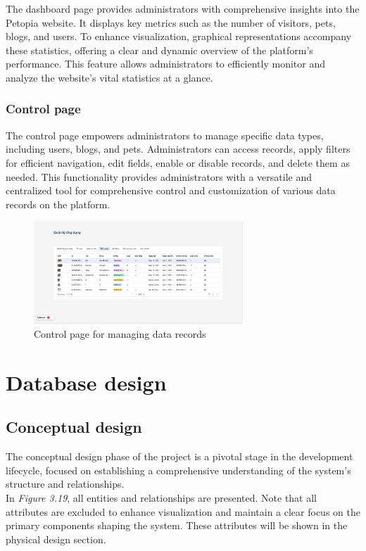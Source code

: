 The dashboard page provides administrators with comprehensive insights into the Petopia website. It displays key metrics such as the number of visitors, pets, blogs, and users. To enhance visualization, graphical representations accompany these statistics, offering a clear and dynamic overview of the platform's performance. This feature allows administrators to efficiently monitor and analyze the website's vital statistics at a glance.

\subsubsection{Control page}

The control page empowers administrators to manage specific data types, including users, blogs, and pets. Administrators can access records, apply filters for efficient navigation, edit fields, enable or disable records, and delete them as needed. This functionality provides administrators with a versatile and centralized tool for comprehensive control and customization of various data records on the platform.

\begin {figure}[H]
\centering
\includegraphics[width=0.7\textwidth]{Figures/UI/control_bo_ui.png}
\caption{Control page for managing data records}
\end{figure}

\newpage
\section{Database design}

\subsection{Conceptual design}

The conceptual design phase of the project is a pivotal stage in the development lifecycle, focused on establishing a comprehensive understanding of the system's structure and relationships.
\\
In \textit{Figure 3.19}, all entities and relationships are presented. Note that all attributes are excluded to enhance visualization and maintain a clear focus on the primary components shaping the system. These attributes will be shown in the physical design section.

